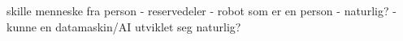 skille menneske fra person
- reservedeler
- robot som er en person
- naturlig?
- kunne en datamaskin/AI utviklet seg naturlig?
